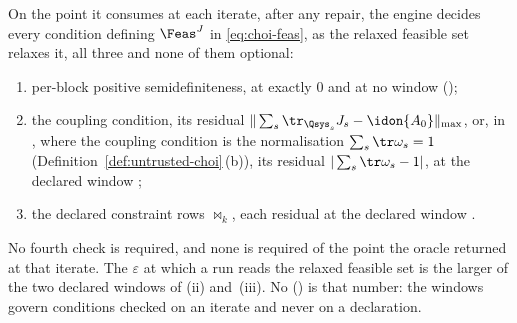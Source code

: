 \begin{requirement}\label{req:iterate-checks}
On the point it consumes at each iterate, after any repair, the engine
decides every condition defining $\Feas^{J}$ in \eqref{eq:choi-feas}, as the
relaxed feasible set relaxes it, all three and none of them optional:
\begin{enumerate}[label=(\roman*),leftmargin=2.4em]
\item per-block positive semidefiniteness, at exactly $0$ and at no window
  ();
\item the coupling condition, its residual
  $\|\sum_s\tr_{\Qsys_s}J_s-\idon{A_0}\|_{\max}$, or, in
  , where the coupling condition is the
  normalisation $\sum_s\tr\omega_s=1$
  (Definition~\ref{def:untrusted-choi}\,(b)), its residual
  $|\sum_s\tr\omega_s-1|$, at the declared window ;
\item the declared constraint rows $\bowtie_k$, each residual at the declared
  window .
\end{enumerate}
No fourth check is required, and none is required of the point the oracle
returned at that iterate. The
$\varepsilon$ at which a run reads the relaxed feasible set is the larger of
the two declared windows of (ii) and~(iii). No  () is
that number: the windows govern conditions checked on an iterate and never on
a declaration.
\end{requirement}
